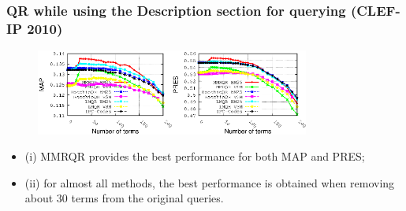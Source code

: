 \documentclass[xcolor=x11names,compress]{beamer}
\renewcommand{\(}{\begin{columns}}
\renewcommand{\)}{\end{columns}}
\newcommand{\<}[1]{\begin{column}{#1}}
\renewcommand{\>}{\end{column}}
\begin{document}
\begin{frame}
\frametitle{QR while using the Description section for querying (CLEF-IP 2010)}

\begin{center}
\begin{figure}
\begin{centering}
\includegraphics[width=4.5cm]{../mmrqrResults/qDescription-sDescription_MAP_2010}\includegraphics[width=4.5cm]{../mmrqrResults/qDescription-sDescription_PRES_2010}
\par\end{centering}
\end{figure}
\par\end{center}

\begin{itemize}
\item (i) MMRQR provides the best
performance for both MAP and PRES;
\item (ii) for almost all methods,
the best performance is obtained when removing about 30 terms from
the original queries. 
\end{itemize}
\end{frame}
\end{document}
